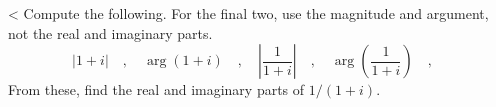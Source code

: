 <%
Compute the following. For the final two, use the magnitude and argument, not the real and imaginary parts.
\begin{equation*}
|1+i| \quad , \quad
 \arg(1+i) \quad , \quad
 \left|\frac{1}{1+i}\right| \quad , \quad
 \arg\left(\frac{1}{1+i}\right) \quad , \quad
\end{equation*}
From these, find the real and imaginary parts of $1/(1+i)$.
